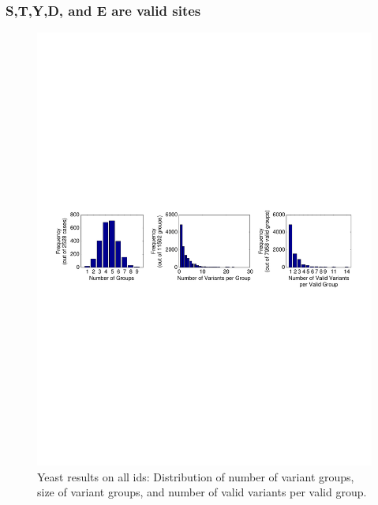 \subsubsection{S,T,Y,D, and E are valid sites}
\begin{figure}[htbp]
\centering %
\includegraphics[trim = 2mm 105mm 4mm 105mm,
clip,width=\textwidth]{fig/phospho/allIds/size_dist_all_by_STYDE.pdf}
\caption{Yeast results on all ids: Distribution of number of variant groups, size of variant groups, and number of valid variants per valid group.}
\label{fig:yeast_sizedist_STYDE}
\end{figure}

